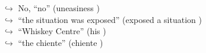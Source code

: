 \documentclass[11pt,a4paper, onecolumn]{article}
\begin{document}
\begin{figure}[t]
\begin{tcolorbox}[boxsep=0pt,left=5pt,right=0pt,top=2pt,colback = yellow!5]
\begin{dialogue}
\colorbox{pink!25}{$\hookrightarrow$}
\colorbox{red!25}{No,}
{ ``no'' (uneasiness ) }
\\
\colorbox{pink!25}{$\hookrightarrow$}
{ ``the situation was exposed'' (exposed a situation ) }
\\
\colorbox{pink!25}{$\hookrightarrow$}
{ ``Whiskey Centre'' (his ) }
\\
\colorbox{pink!25}{$\hookrightarrow$}
{ ``the chiente'' (chiente ) }
\\
 \end{dialogue}\end{tcolorbox}\end{figure}
\end{document}
